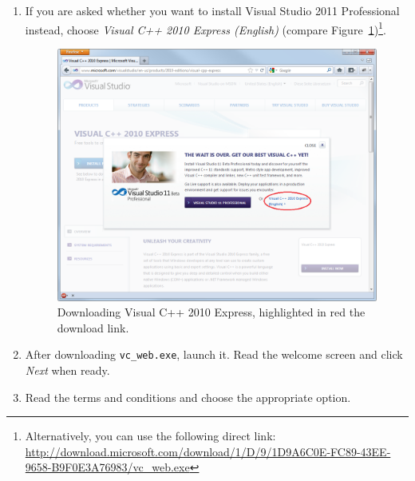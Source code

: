\begin{enumerate}
	\item If you are asked whether you want to install Visual Studio 2011 Professional instead,
		choose \emph{Visual C++ 2010 Express (English)} (compare Figure~\ref{fig:setup_vs_download2})\footnote{
		Alternatively, you can use the following direct link:\\
		\url{http://download.microsoft.com/download/1/D/9/1D9A6C0E-FC89-43EE-9658-B9F0E3A76983/vc_web.exe}}.

\begin{figure}[htbp]
	\centering
	\includegraphics[scale=0.45]{figures/PNG/setup_vs_download2_edited.png}
	\caption{Downloading Visual C++ 2010 Express, highlighted in red the download link.}
	\label{fig:setup_vs_download2}
\end{figure}

	\item After downloading \texttt{vc\_web.exe}, launch it.
		Read the welcome screen and click \emph{Next} when ready. %


	\item Read the terms and conditions and choose the appropriate option. %



\end{enumerate}
